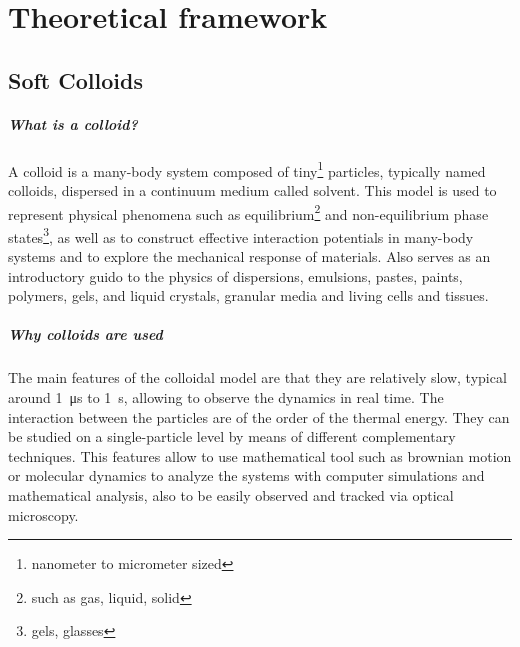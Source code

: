 \chapter{Theoretical framework}\label{ch2:Theoframework}



\section{Soft Colloids}

\paragraph{What is a colloid?} A colloid is a many-body system composed of tiny\footnote{nanometer to micrometer sized} particles, typically named colloids, dispersed in a continuum medium called solvent. 
This model is used to represent physical phenomena such as equilibrium\footnote{such as gas, liquid, solid} and non-equilibrium phase states\footnote{gels, glasses}, as well as to construct effective interaction potentials in many-body systems and to explore the mechanical response of materials.
Also serves as an introductory guido to the physics of dispersions, emulsions, pastes, paints, polymers, gels, and liquid crystals, granular media and living cells and tissues\citep{castanedapriegoColloidalSoftMatter2021,yunkerPhysicsOrderedDisordered2014}.

\paragraph{Why colloids are used} The main features of the colloidal model are that they are relatively slow, typical around \SI{1}{\micro\second} to \SI{1}{\second}, allowing to observe the dynamics in real time.
The interaction between the particles are of the order of the thermal energy.
They can be studied on a single-particle level by means of different complementary techniques\citep{castanedapriegoColloidalSoftMatter2021,yunkerPhysicsOrderedDisordered2014}. 
This features allow to use mathematical tool such as brownian motion or molecular dynamics to analyze the systems with computer simulations and mathematical analysis, also to be easily observed and tracked via optical microscopy.

